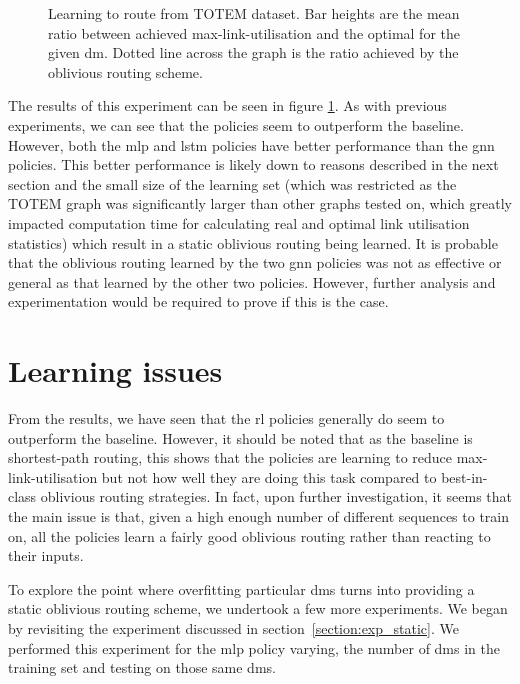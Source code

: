 \begin{figure}
    \centering
    \resizebox{\textwidth}{!}{}
    \caption{Learning to route from TOTEM dataset. Bar heights are the mean ratio between achieved max-link-utilisation and the optimal for the given \ac{dm}. Dotted line across the graph is the ratio achieved by the oblivious routing scheme.}
    \label{fig:exp_real}
\end{figure}

The results of this experiment can be seen in figure \ref{fig:exp_real}. As with previous experiments, we can see that the policies seem to outperform the baseline. However, both the \ac{mlp} and \ac{lstm} policies have better performance than the \ac{gnn} policies. This better performance is likely down to reasons described in the next section and the small size of the learning set (which was restricted as the TOTEM graph was significantly larger than other graphs tested on, which greatly impacted computation time for calculating real and optimal link utilisation statistics) which result in a static oblivious routing being learned. It is probable that the oblivious routing learned by the two \ac{gnn} policies was not as effective or general as that learned by the other two policies. However, further analysis and experimentation would be required to prove if this is the case.


\section{Learning issues}
\label{section:overfit}
From the results, we have seen that the \ac{rl} policies generally do seem to outperform the baseline. However, it should be noted that as the baseline is shortest-path routing, this shows that the policies are learning to reduce max-link-utilisation but not how well they are doing this task compared to best-in-class oblivious routing strategies. In fact, upon further investigation, it seems that the main issue is that, given a high enough number of different sequences to train on, all the policies learn a fairly good oblivious routing rather than reacting to their inputs.

To explore the point where overfitting particular \acp{dm} turns into providing a static oblivious routing scheme, we undertook a few more experiments. We began by revisiting the experiment discussed in section~\ref{section:exp_static}. We performed this experiment for the \ac{mlp} policy varying, the number of \acp{dm} in the training set and testing on those same \acp{dm}.

